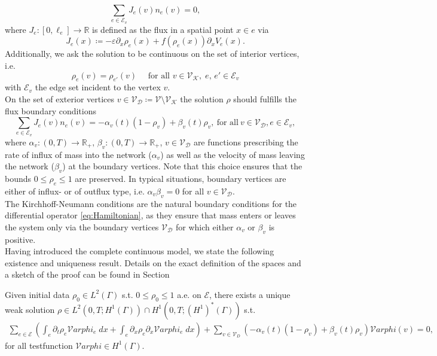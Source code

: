 \begin{equation}
    \label{eq:Kirchhoff_Neumann_condition}
    \sum_{e\in \mathcal{E}_v} J_e(v) n_e (v)=0,
\end{equation}
where $J_e \colon [0, \ell_e] \to \mathbb{R}$ is defined as the flux in a spatial point $x \in e$ via 
\begin{equation} 
    \label{eq:flux} 
    J_e(x) \coloneqq - \varepsilon \partial_x \rho_e (x) + f(\rho_e(x)) \partial_x V_e(x).
\end{equation}
Additionally, we ask the solution to be continuous on the set of interior vertices, i.e. 
\begin{equation}
    \rho_e(v) = \rho_{e'}(v) \quad \text{ for all }v \in \mathcal{V}_\mathcal{K},\; e,\,e' \in \mathcal{E}_v
\end{equation}
with $\mathcal{E}_v$ the edge set incident to the vertex $v$. \\
On the set of exterior vertices $v \in \mathcal{V}_\mathcal{D} \coloneqq \mathcal{V} \setminus \mathcal{V}_\mathcal{K}$ the solution $\rho$ should fulfills the flux boundary conditions
\begin{equation}
    \label{eq:Dirichlet_conditions}
    \sum_{e\in \mathcal{E}_v}J_e(v) n_e (v)=-\alpha_v(t) (1-\rho_v) + \beta_v(t) \rho_v,\ \text{for all}\ v \in \mathcal{V}_\mathcal{D}, e \in \mathcal{E}_v,
\end{equation}
where $\alpha_v \colon (0,T) \to \mathbb{R}_{+}, \, \beta_v \colon (0,T) \to \mathbb{R}_{+}$, ${v \in \mathcal{V}_\mathcal{D}}$ are functions prescribing the rate of influx of mass into the network ($\alpha_v$) as well as the velocity of mass leaving the network ($\beta_v$) at the boundary vertices. Note that this choice ensures that the bounds $0 \le \rho_e \le 1$ are preserved. In typical situations, boundary vertices are either of influx- or of outflux type, i.e. $\alpha_v \beta_v = 0$ for all $v \in \mathcal{V}_\mathcal{D}$. \\
The Kirchhoff-Neumann conditions are the natural boundary conditions for the differential operator \eqref{eq:Hamiltonian}, as they ensure that mass enters or leaves the system only via the boundary vertices $\mathcal{V}_\mathcal{D}$ for which either $\alpha_v$ or $\beta_v$ is positive. \\
Having introduced the complete continuous model, we state the following existence and uniqueness result. Details on the exact definition of the spaces and a sketch of the proof can be found in Section 

\begin{theorem} 
    Given initial data $\rho_0 \in L^2(\Gamma)$ s.t. $0 \le \rho_0 \le 1$ a.e. on $\mathcal{E}$, there exists a unique weak solution $\rho \in L^2(0,T; H^1(\Gamma)) \cap H^1(0,T; (H^1)^*(\Gamma))$ s.t.
	\begin{align*}
		\sum_{e \in \mathcal{E}} \left(\int_e  \partial_t \rho_e \mathcal{V}arphi_e \;dx + \int_e \partial_x \rho_e\partial_x \mathcal{V}arphi_e \;dx\right) + \sum_{v \in \mathcal{V}_D} (-\alpha_v(t) (1-\rho_v) + \beta_v(t) \rho_v)\mathcal{V}arphi(v) = 0,
	\end{align*}
	for all testfunction $\mathcal{V}arphi \in H^1(\Gamma)$.
\end{theorem}

